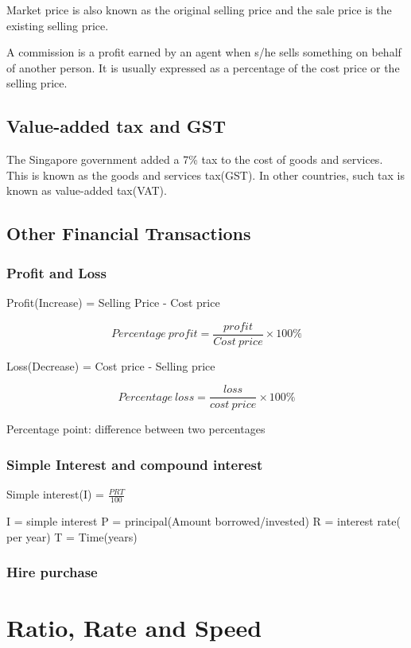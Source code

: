 \documentclass[../main]{subfiles}
\begin{document}
Market price is also known as the original selling price and the sale price is
the existing selling price.

A commission is a profit earned by an agent when s/he sells something on behalf
of another person. It is usually expressed as a percentage of the cost price or
the selling price.

\subsection{Value-added tax and GST}
The Singapore government added a 7\% tax to the cost of goods and services. This
is known as the goods and services tax(GST). In other countries, such tax is
known as value-added tax(VAT).


\subsection{Other Financial Transactions}
\subsubsection{Profit and Loss}

Profit(Increase) = Selling Price - Cost price

\[Percentage\ profit={\frac {profit} {Cost\ price}} \times 100\%\]

Loss(Decrease) = Cost price - Selling price

\[  Percentage\ loss = {\frac {loss} {cost\ price}} \times 100\%\]


Percentage point: difference between two percentages

\subsubsection{Simple Interest and compound interest}

Simple interest(I) = \({\frac {PRT} {100}}\)

I = simple interest
P = principal(Amount borrowed/invested)
R = interest rate( per year)
T = Time(years)

\subsubsection{Hire purchase}

\section{Ratio, Rate and Speed}
\end{document}
